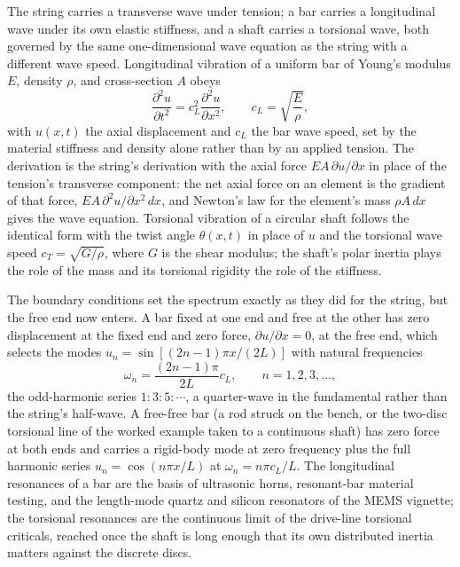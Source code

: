 The string carries a transverse wave under tension; a bar carries a
longitudinal wave under its own elastic stiffness, and a shaft carries a
torsional wave, both governed by the same one-dimensional wave equation
as the string with a different wave speed. Longitudinal vibration of a
uniform bar of Young's modulus $E$, density $\rho$, and cross-section
$A$ obeys
\[
\frac{\partial^2 u}{\partial t^2} = c_L^2\frac{\partial^2 u}{\partial
x^2}, \qquad c_L = \sqrt{\frac{E}{\rho}},
\]
with $u(x,t)$ the axial displacement and $c_L$ the bar wave speed, set
by the material stiffness and density alone rather than by an applied
tension. The derivation is the string's derivation with the axial force
$EA\,\partial u/\partial x$ in place of the tension's transverse
component: the net axial force on an element is the gradient of that
force, $EA\,\partial^2 u/\partial x^2\,dx$, and Newton's law for the
element's mass $\rho A\,dx$ gives the wave equation. Torsional vibration
of a circular shaft follows the identical form with the twist angle
$\theta(x,t)$ in place of $u$ and the torsional wave speed $c_T =
\sqrt{G/\rho}$, where $G$ is the shear modulus; the shaft's polar
inertia plays the role of the mass and its torsional rigidity the role
of the stiffness.

The boundary conditions set the spectrum exactly as they did for the
string, but the free end now enters. A bar fixed at one end and free at
the other has zero displacement at the fixed end and zero force,
$\partial u/\partial x = 0$, at the free end, which selects the modes
$u_n = \sin[(2n-1)\pi x/(2L)]$ with natural frequencies
\[
\omega_n = \frac{(2n-1)\pi}{2L}c_L, \qquad n = 1, 2, 3,\ldots,
\]
the odd-harmonic series $1 : 3 : 5 : \cdots$, a quarter-wave in the
fundamental rather than the string's half-wave. A free-free bar (a
rod struck on the bench, or the two-disc torsional line of the worked
example taken to a continuous shaft) has zero force at both ends and
carries a rigid-body mode at zero frequency plus the full harmonic
series $u_n = \cos(n\pi x/L)$ at $\omega_n = n\pi c_L/L$. The
longitudinal resonances of a bar are the basis of ultrasonic horns,
resonant-bar material testing, and the length-mode quartz and
silicon resonators of the MEMS vignette; the torsional resonances are
the continuous limit of the drive-line torsional criticals, reached
once the shaft is long enough that its own distributed inertia matters
against the discrete discs.

